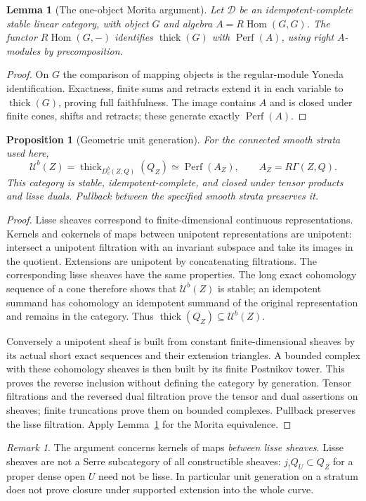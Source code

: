 \documentclass[11pt]{article}
\newtheorem{proposition}[theorem]{Proposition}
\newtheorem{lemma}[theorem]{Lemma}
\theoremstyle{definition}
\theoremstyle{remark}
\newtheorem{remark}[theorem]{Remark}
\newcommand{\Perf}{\operatorname{Perf}}
\newcommand{\RHom}{R\operatorname{Hom}}
\newcommand{\thick}{\operatorname{thick}}
\begin{document}
\begin{lemma}[The one-object Morita argument]\label{lem:morita}
Let $\mathcal D$ be an idempotent-complete stable linear category, with
object $G$ and algebra $A=\RHom(G,G)$.  The functor $\RHom(G,-)$ identifies
$\thick(G)$ with $\Perf(A)$, using right $A$-modules by precomposition.
\end{lemma}
\begin{proof}
On $G$ the comparison of mapping objects is the regular-module Yoneda
identification.  Exactness, finite sums and retracts extend it in each
variable to $\thick(G)$, proving full faithfulness.  The image contains
$A$ and is closed under finite cones, shifts and retracts; these generate
exactly $\Perf(A)$.
\end{proof}

\begin{proposition}[Geometric unit generation]\label{prop:unit-generation}
For the connected smooth strata used here,
\[
 \mathcal U^b(Z)=\thick_{D_c^b(Z,Q)}(Q_Z)
 \simeq \Perf(A_Z),\qquad A_Z=R\Gamma(Z,Q).
\]
This category is stable, idempotent-complete, and closed under tensor
products and lisse duals.  Pullback between the specified smooth strata
preserves it.
\end{proposition}
\begin{proof}
Lisse sheaves correspond to finite-dimensional continuous representations.
Kernels and cokernels of maps between unipotent representations are
unipotent: intersect a unipotent filtration with an invariant subspace
and take its images in the quotient.  Extensions are unipotent by
concatenating filtrations.  The corresponding lisse sheaves have the
same properties.  The long exact cohomology sequence of a cone therefore
shows that $\mathcal U^b(Z)$ is stable; an idempotent summand has cohomology
an idempotent summand of the original representation and remains in the
category.  Thus $\thick(Q_Z)\subseteq\mathcal U^b(Z)$.

Conversely a unipotent sheaf is built from constant finite-dimensional
sheaves by its actual short exact sequences and their extension
triangles.  A bounded complex with these cohomology sheaves is then
built by its finite Postnikov tower.  This proves the reverse inclusion
without defining the category by generation.  Tensor filtrations and
the reversed dual filtration prove the tensor and dual assertions on
sheaves; finite truncations prove them on bounded complexes.  Pullback
preserves the lisse filtration.  Apply Lemma~\ref{lem:morita} for the
Morita equivalence.
\end{proof}
\begin{remark}
The argument concerns kernels of maps \emph{between lisse sheaves}.
Lisse sheaves are not a Serre subcategory of all constructible sheaves:
$j_!Q_U\subset Q_Z$ for a proper dense open $U$ need not be lisse.
In particular unit generation on a stratum does not prove closure
under supported extension into the whole curve.
\end{remark}
\end{document}
